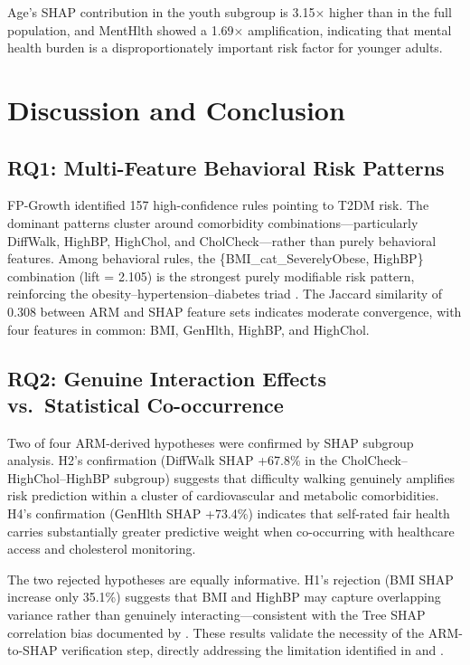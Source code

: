 ﻿\documentclass[12pt,a4paper]{article}
\begin{document}
Age's SHAP contribution in the youth subgroup is 3.15$\times$ higher than in the full
population, and MentHlth showed a 1.69$\times$ amplification, indicating that mental
health burden is a disproportionately important risk factor for younger adults.

\section{Discussion and Conclusion}

\subsection{RQ1: Multi-Feature Behavioral Risk Patterns}

FP-Growth identified 157 high-confidence rules pointing to T2DM risk. The dominant patterns
cluster around comorbidity combinations---particularly DiffWalk, HighBP, HighChol, and
CholCheck---rather than purely behavioral features. Among behavioral rules, the
\{BMI\_cat\_SeverelyObese, HighBP\} combination (lift = 2.105) is the strongest purely
modifiable risk pattern, reinforcing the obesity--hypertension--diabetes triad
\citep{Duncan2025, Vuong2024}. The Jaccard similarity of 0.308 between ARM and SHAP
feature sets indicates moderate convergence, with four features in common: BMI, GenHlth,
HighBP, and HighChol.

\subsection{RQ2: Genuine Interaction Effects vs.\ Statistical Co-occurrence}

Two of four ARM-derived hypotheses were confirmed by SHAP subgroup analysis. H2's
confirmation (DiffWalk SHAP +67.8\% in the CholCheck--HighChol--HighBP subgroup) suggests
that difficulty walking genuinely amplifies risk prediction within a cluster of cardiovascular
and metabolic comorbidities. H4's confirmation (GenHlth SHAP +73.4\%) indicates that
self-rated fair health carries substantially greater predictive weight when co-occurring
with healthcare access and cholesterol monitoring.

The two rejected hypotheses are equally informative. H1's rejection (BMI SHAP increase
only 35.1\%) suggests that BMI and HighBP may capture overlapping variance rather than
genuinely interacting---consistent with the Tree SHAP correlation bias documented by
\citet{AlHudaibi2025}. These results validate the necessity of the ARM-to-SHAP verification
step, directly addressing the limitation identified in \citet{Bata2025} and \citet{Fakir2024}.
\end{document}
